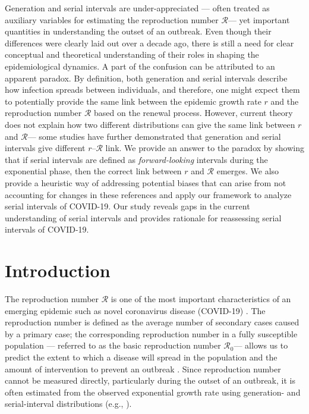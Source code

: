 \documentclass[12pt]{article}
\newcommand{\Rx}[1]{\ensuremath{{\mathcal R}_{#1}}\xspace}
\newcommand{\Ro}{\Rx{0}}
\newcommand{\RR}{\ensuremath{{\mathcal R}}\xspace}
\begin{document}
Generation and serial intervals are under-appreciated --- often treated as auxiliary variables for estimating the reproduction number \RR --- yet important quantities in understanding the outset of an outbreak.
Even though their differences were clearly laid out over a decade ago, there is still a need for clear conceptual and theoretical understanding of their roles in shaping the epidemiological dynamics.
A part of the confusion can be attributed to an apparent paradox.
By definition, both generation and serial intervals describe how infection spreads between individuals, and therefore, one might expect them to potentially provide the same link between the epidemic growth rate $r$ and the reproduction number \RR based on the renewal process.
However, current theory does not explain how two different distributions can give the same link between $r$ and \RR --- some studies have further demonstrated that generation and serial intervals give different $r$--\RR link.
We provide an answer to the paradox by showing that if serial intervals are defined as \emph{forward-looking} intervals during the exponential phase, then the correct link between $r$ and \RR emerges.
We also provide a heuristic way of addressing potential biases that can arise from not accounting for changes in these references and apply our framework to analyze serial intervals of COVID-19.
Our study reveals gaps in the current understanding of serial intervals and provides rationale for reassessing serial intervals of COVID-19.

\pagebreak

\section{Introduction}

The reproduction number \RR is one of the most important characteristics of an emerging epidemic such as novel coronavirus disease (COVID-19) \citep{majumder2020early}.
The reproduction number is defined as the average number of secondary cases caused by a primary case;
the corresponding reproduction number in a fully susceptible population --- referred to as the basic reproduction number \Ro --- allows us to predict the extent to which a disease will spread in the population and the amount of intervention to prevent an outbreak \citep{anderson1991infectious}.
Since reproduction number cannot be measured directly, particularly during the outset of an outbreak, it is often estimated from the observed exponential growth rate using generation- and serial-interval distributions (e.g., \cite{du2020serial, jung2020real, li2020early, zhao2020preliminary}).
\end{document}
